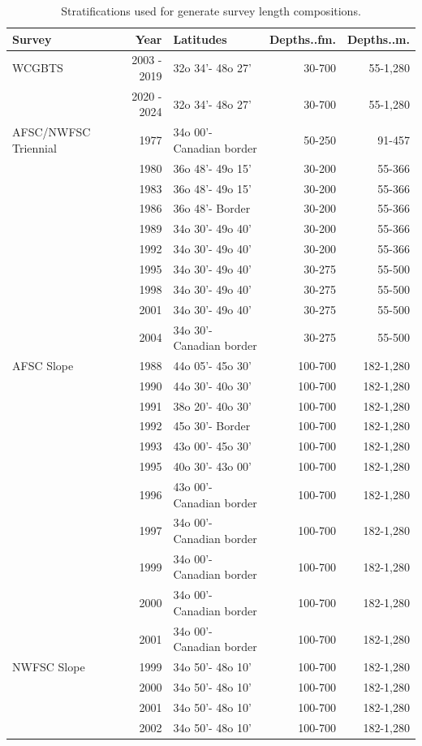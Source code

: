 \documentclass[
]{scrartcl}
\begin{document}
\begin{longtable}{lrlrr}

\caption{\label{tbl-survey_coverage}Stratifications used for generate
survey length compositions.}

\tabularnewline

\toprule
Survey & Year & Latitudes & Depths..fm. & Depths..m. \\ 
\midrule\addlinespace[2.5pt]
WCGBTS & 2003 - 2019 & 32o 34'- 48o 27' & 30-700 & 55-1,280 \\ 
 & 2020 - 2024 & 32o 34'- 48o 27' & 30-700 & 55-1,280 \\ 
AFSC/NWFSC Triennial & 1977 & 34o 00'- Canadian border & 50-250 & 91-457 \\ 
 & 1980 & 36o 48'- 49o 15' & 30-200 & 55-366 \\ 
 & 1983 & 36o 48'- 49o 15' & 30-200 & 55-366 \\ 
 & 1986 & 36o 48'- Border & 30-200 & 55-366 \\ 
 & 1989 & 34o 30'- 49o 40' & 30-200 & 55-366 \\ 
 & 1992 & 34o 30'- 49o 40' & 30-200 & 55-366 \\ 
 & 1995 & 34o 30'- 49o 40' & 30-275 & 55-500 \\ 
 & 1998 & 34o 30'- 49o 40' & 30-275 & 55-500 \\ 
 & 2001 & 34o 30'- 49o 40' & 30-275 & 55-500 \\ 
 & 2004 & 34o 30'- Canadian border & 30-275 & 55-500 \\ 
AFSC Slope & 1988 & 44o 05'- 45o 30' & 100-700 & 182-1,280 \\ 
 & 1990 & 44o 30'- 40o 30' & 100-700 & 182-1,280 \\ 
 & 1991 & 38o 20'- 40o 30' & 100-700 & 182-1,280 \\ 
 & 1992 & 45o 30'- Border & 100-700 & 182-1,280 \\ 
 & 1993 & 43o 00'- 45o 30' & 100-700 & 182-1,280 \\ 
 & 1995 & 40o 30'- 43o 00' & 100-700 & 182-1,280 \\ 
 & 1996 & 43o 00'- Canadian border & 100-700 & 182-1,280 \\ 
 & 1997 & 34o 00'- Canadian border & 100-700 & 182-1,280 \\ 
 & 1999 & 34o 00'- Canadian border & 100-700 & 182-1,280 \\ 
 & 2000 & 34o 00'- Canadian border & 100-700 & 182-1,280 \\ 
 & 2001 & 34o 00'- Canadian border & 100-700 & 182-1,280 \\ 
NWFSC Slope & 1999 & 34o 50'- 48o 10' & 100-700 & 182-1,280 \\ 
 & 2000 & 34o 50'- 48o 10' & 100-700 & 182-1,280 \\ 
 & 2001 & 34o 50'- 48o 10' & 100-700 & 182-1,280 \\ 
 & 2002 & 34o 50'- 48o 10' & 100-700 & 182-1,280 \\ 
\bottomrule

\end{longtable}
\end{document}
